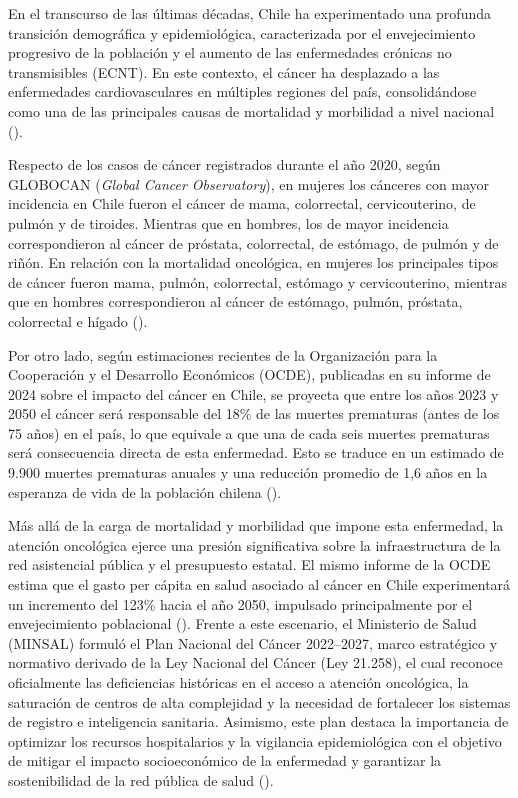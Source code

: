 En el transcurso de las últimas décadas, Chile ha experimentado una profunda transición demográfica y epidemiológica, caracterizada por el envejecimiento progresivo de la población y el aumento de las enfermedades crónicas no transmisibles (ECNT). En este contexto, el cáncer ha desplazado a las enfermedades cardiovasculares en múltiples regiones del país, consolidándose como una de las principales causas de mortalidad y morbilidad a nivel nacional (\cite{minsal2022}).


Respecto de los casos de cáncer registrados durante el año 2020, según GLOBOCAN (\textit{Global Cancer Observatory}), en mujeres los cánceres con mayor incidencia en Chile fueron el cáncer de mama, colorrectal, cervicouterino, de pulmón y de tiroides. Mientras que en hombres, los de mayor incidencia correspondieron al cáncer de próstata, colorrectal, de estómago, de pulmón y de riñón. En relación con la mortalidad oncológica, en mujeres los principales tipos de cáncer fueron mama, pulmón, colorrectal, estómago y cervicouterino, mientras que en hombres correspondieron al cáncer de estómago, pulmón, próstata, colorrectal e hígado (\cite{minsal2022}).


Por otro lado, según estimaciones recientes de la Organización para la Cooperación y el Desarrollo Económicos (OCDE), publicadas en su informe de 2024 sobre el impacto del cáncer en Chile, se proyecta que entre los años 2023 y 2050 el cáncer será responsable del 18\% de las muertes prematuras (antes de los 75 años) en el país, lo que equivale a que una de cada seis muertes prematuras será consecuencia directa de esta enfermedad. Esto se traduce en un estimado de 9.900 muertes prematuras anuales y una reducción promedio de 1,6 años en la esperanza de vida de la población chilena (\cite{oecd2024}).

Más allá de la carga de mortalidad y morbilidad que impone esta enfermedad, la atención oncológica ejerce una presión significativa sobre la infraestructura de la red asistencial pública y el presupuesto estatal. El mismo informe de la OCDE estima que el gasto per cápita en salud asociado al cáncer en Chile experimentará un incremento del 123\% hacia el año 2050, impulsado principalmente por el envejecimiento poblacional (\cite{oecd2024}). Frente a este escenario, el Ministerio de Salud (MINSAL) formuló el Plan Nacional del Cáncer 2022--2027, marco estratégico y normativo derivado de la Ley Nacional del Cáncer (Ley 21.258), el cual reconoce oficialmente las deficiencias históricas en el acceso a atención oncológica, la saturación de centros de alta complejidad y la necesidad de fortalecer los sistemas de registro e inteligencia sanitaria. Asimismo, este plan destaca la importancia de optimizar los recursos hospitalarios y la vigilancia epidemiológica con el objetivo de mitigar el impacto socioeconómico de la enfermedad y garantizar la sostenibilidad de la red pública de salud (\cite{minsal2022}).

